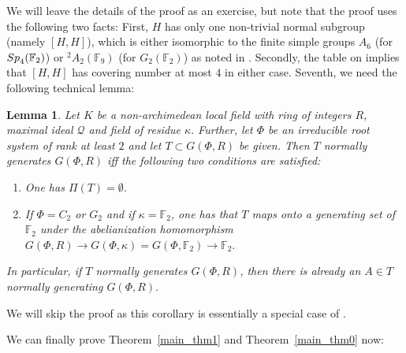 \documentclass[12pt]{amsart}
\newcommand{\C}[1]{{\mathcal #1}}
\newtheorem{lemma}[theorem]{Lemma}
\theoremstyle{definition}\newtheorem{definition}[theorem]{Definition}
\theoremstyle{remark}\newtheorem{remark}[theorem]{Remark}
\theoremstyle{definition}\newtheorem{case}{Case}
\begin{document}
We will leave the details of the proof as an exercise, but note that the proof uses the following two facts: First, $H$ has only one non-trivial normal subgroup (namely $[H,H]$), which is either isomorphic to the finite simple groups $A_6$ (for ${\rm Sp}_4(\mathbb{F}_2)$) or $^2A_2(\mathbb{F}_9)$ (for $G_2(\mathbb{F}_2)$) as noted in \cite[Chapter~4]{MR3616493}. Secondly, the table on \cite[P.~61]{Karni_paper} implies that $[H,H]$ has covering number at most $4$ in either case. Seventh, we need the following technical lemma:

\begin{lemma}\label{normally_gen_set_adic}
Let $K$ be a non-archimedean local field with ring of integers $R$, maximal ideal $\C Q$ and field of residue $\kappa.$ Further, let $\Phi$ be an irreducible root system of rank at least $2$ and let $T\subset G(\Phi,R)$ be given. Then $T$ normally generates $G(\Phi,R)$ iff the following two conditions are satisfied:
\begin{enumerate}
\item One has $\Pi(T)=\emptyset$.
\item If $\Phi=C_2$ or $G_2$ and if $\kappa=\mathbb{F}_2$, one has that $T$ maps onto a generating set of $\mathbb{F}_2$ under the abelianization homomorphism $G(\Phi,R)\to G(\Phi,\kappa)=G(\Phi,\mathbb{F}_2)\to\mathbb{F}_2.$
\end{enumerate}
In particular, if $T$ normally generates $G(\Phi,R)$, then there is already an $A\in T$ normally generating $G(\Phi,R).$
\end{lemma}

We will skip the proof as this corollary is essentially a special case of \cite[Corollary~3.12]{General_strong_bound}.

We can finally prove Theorem~\ref{main_thm1} and Theorem~\ref{main_thm0} now:
\end{document}
